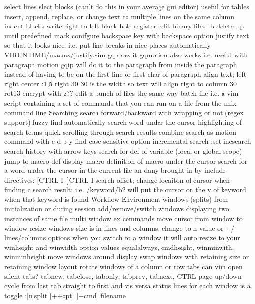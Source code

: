 \documentclass[12pt]{book}
\begin{document}
{    select lines
    slect blocks (can't do this in your average gui editor)
      useful for tables
      insert, append, replace, or change text to multiple lines on the same column
      indent blocks
  write right to left
  black hole register
  edit binary files -b
  delete up until predefined mark
  conifgure backspace key with backspace option
  justify text so that it looks nice; i.e. put line breaks in nice places automatically
    VIRUNTIME/macros/justify.vim
    gq does it
    gqmotion also works i.e. useful with paragraph motion
    gqip will do it to the paragraph from inside the paragraph instead of having to be on the first line or first char of paragraph
  align text; left right center
    :1,5 right 30
    30 is the width so text will align right to column 30
  rot13 encrypt with g??
  edit a bunch of files the same way
    batch file i.e. a vim script containing a set of commands that you can run on a file from the unix command line
Searching
  search forward/backward with wrapping or not (regex support)
  fuzzy find
  automatically search word under the cursor
  highlighting of search terms
  quick scrolling through search results
  combine search as motion command with c d p y
  find
  case sensitive option
  incremental search :set incsearch
  search history with arrow keys
  search for def of variable (local or global scope)
  jump to macro def
  display macro definition of macro under the cursor
  search for a word under the cursor in the current file an dany brought in by include directives: [CTRL-I, ]CTRL-I
  search offset; change locaiton of cursor when finding a search result; i.e. /keyword/b2 will put the cursor on the y of keyword when that keyword is found
Workflow
  Environment
    windows (splits)
      from initialization or during session
      add/remove/switch windows
      displaying two instances of same file
      multi window ex commands
      move cursor from window to window
      resize windows
        size is in lines and columns; change to n value or +/- lines/columns
        options
          when you switch to a window it will auto resize to your winheight and winwidth option values
          equalalways, cmdheight, winminwith, winminheight
      move windows around display
        swap windows with retaining size or retaining window layout
        rotate windows of a column or row
      tabs
        can vim open silent tabs?
        tabnew, tabclose, tabonly, tabprev, tabnext, CTRL page up/down
        cycle from last tab straight to first and vis versa
      status lines for each window is a toggle
      :[n]split [++opt] [+cmd] filename
}
\end{document}
